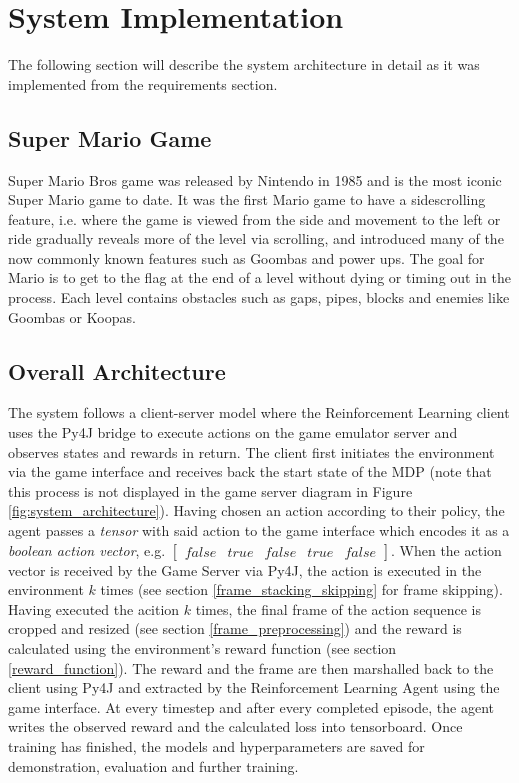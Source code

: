 \documentclass[notitlepage,a4paper,11pt]{article}
\begin{document}
	

\section{System Implementation}
The following section will describe the system architecture in detail as it was implemented from the requirements section.


\subsection{Super Mario Game}
Super Mario Bros game was released by Nintendo in 1985 and is the most iconic Super Mario game to date. It was the first Mario game to have a sidescrolling feature, i.e. where the game is viewed from the side and movement to the left or ride gradually reveals more of the level via scrolling, and introduced many of the now commonly known features such as Goombas and power ups. The goal for Mario is to get to the flag at the end of a level without dying or timing out in the process. Each level contains obstacles such as gaps, pipes, blocks and enemies like Goombas or Koopas. 


\subsection{Overall Architecture}
The system follows a client-server model where the Reinforcement Learning client uses the Py4J bridge to execute actions on the game emulator server and observes states and rewards in return. The client first initiates the environment via the game interface and receives back the start state of the MDP (note that this process is not displayed in the game server diagram in Figure \ref{fig:system_architecture}). Having chosen an action according to their policy, the agent passes a \textit{tensor} with said action to the game interface which encodes it as a \textit{boolean action vector}, e.g. $\begin{bmatrix} false & true & false & true & false\end{bmatrix}$. When the action vector is received by the Game Server via Py4J, the action is executed in the environment $k$ times (see section \ref{frame_stacking_skipping} for frame skipping). Having executed the acition $k$ times, the final frame of the action sequence is cropped and resized (see section \ref{frame_preprocessing}) and the reward is calculated using the environment's reward function (see section \ref{reward_function}). The reward and the frame are then marshalled back to the client using Py4J and extracted by the Reinforcement Learning Agent using the game interface. At every timestep and after every completed episode, the agent writes the observed reward and the calculated loss into tensorboard. Once training has finished, the models and hyperparameters are saved for demonstration, evaluation and further training.
\end{document}
